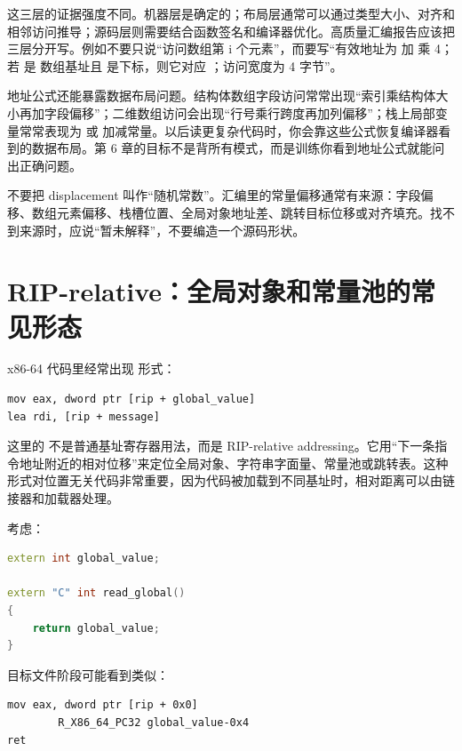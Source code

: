 这三层的证据强度不同。机器层是确定的；布局层通常可以通过类型大小、对齐和相邻访问推导；源码层则需要结合函数签名和编译器优化。高质量汇编报告应该把三层分开写。例如不要只说“访问数组第 i 个元素”，而要写“有效地址为  加  乘 4；若  是  数组基址且  是下标，则它对应 ；访问宽度为 4 字节”。

地址公式还能暴露数据布局问题。结构体数组字段访问常常出现“索引乘结构体大小再加字段偏移”；二维数组访问会出现“行号乘行跨度再加列偏移”；栈上局部变量常常表现为  或  加减常量。以后读更复杂代码时，你会靠这些公式恢复编译器看到的数据布局。第 6 章的目标不是背所有模式，而是训练你看到地址公式就能问出正确问题。

\begin{warningbox}
不要把 displacement 叫作“随机常数”。汇编里的常量偏移通常有来源：字段偏移、数组元素偏移、栈槽位置、全局对象地址差、跳转目标位移或对齐填充。找不到来源时，应说“暂未解释”，不要编造一个源码形状。
\end{warningbox}

\section{RIP-relative：全局对象和常量池的常见形态}

x86-64 代码里经常出现 \code{[rip + ...]} 形式：

\begin{lstlisting}
mov eax, dword ptr [rip + global_value]
lea rdi, [rip + message]
\end{lstlisting}

这里的  不是普通基址寄存器用法，而是 RIP-relative addressing。它用“下一条指令地址附近的相对位移”来定位全局对象、字符串字面量、常量池或跳转表。这种形式对位置无关代码非常重要，因为代码被加载到不同基址时，相对距离可以由链接器和加载器处理。

考虑：

\begin{lstlisting}[language=C++]
extern int global_value;

extern "C" int read_global()
{
    return global_value;
}
\end{lstlisting}

目标文件阶段可能看到类似：

\begin{lstlisting}
mov eax, dword ptr [rip + 0x0]
        R_X86_64_PC32 global_value-0x4
ret
\end{lstlisting}

